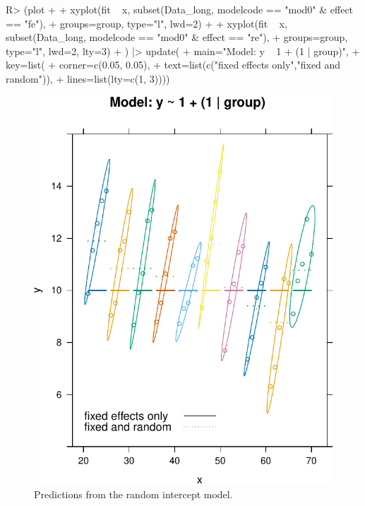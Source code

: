 \documentclass[
]{jss}
\begin{document}
\begin{CodeChunk}
\begin{CodeInput}
R> (plot +
+   xyplot(fit ~ x, subset(Data_long, modelcode == "mod0" & effect == "fe"),
+          groups=group, type="l", lwd=2) +
+   xyplot(fit ~ x, subset(Data_long, modelcode == "mod0" &  effect == "re"),
+          groups=group, type="l", lwd=2, lty=3)
+ ) |> update(
+   main="Model: y ~ 1 + (1 | group)",
+   key=list(
+     corner=c(0.05, 0.05),
+     text=list(c("fixed effects only","fixed and random")),
+     lines=list(lty=c(1, 3))))
\end{CodeInput}
\begin{figure}

{\centering \includegraphics[width=1\linewidth]{JSS-article-reduced_files/figure-latex/plot-fits-mod0-1} 

}

\caption[Predictions from the random intercept model]{Predictions from the random intercept model.}\label{fig:plot-fits-mod0}
\end{figure}
\end{CodeChunk}
\end{document}
